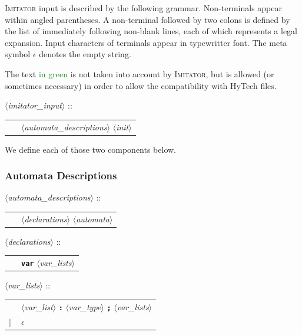 \documentclass[a4paper,10pt]{article}
\newcommand{\emptystring}{$\epsilon$}
\newcommand{\hytech}{{\sc HyTech}}
\newcommand{\imitator}{\textsc{Imitator}}
\newcommand{\nt}[1]{$\langle$\emph{#1}$\rangle$}
\newcommand{\regleGrammaire}[1]{\bigskip \noindent \nt{#1} :: \\}
\newcommand{\npec}[1]{\textcolor{green}{#1}}
\newcommand{\code}[1]{\textbf{\texttt{#1}}}
\begin{document}
\imitator{} input is described by the following grammar.
Non-terminals appear within angled parentheses.
A non-terminal followed by two colons is defined by the list of immediately following non-blank lines, each of which represents a legal expansion.
Input characters of terminals appear in typewritter font.
The meta symbol \emptystring{} denotes the empty string.

The text \npec{in green} is not taken into account by \imitator{}, but is allowed (or sometimes necessary) in order to allow the compatibility with \hytech{} files.


\regleGrammaire{imitator\_input}
\begin{tabular}{l l}
	\  & \nt{automata\_descriptions} \nt{init} \\
\end{tabular}

\medskip


We define each of those two components below.

\subsubsection{Automata Descriptions}

\regleGrammaire{automata\_descriptions}
\begin{tabular}{l l}
	\  & \nt{declarations} \nt{automata} \\
\end{tabular}

\regleGrammaire{declarations}
\begin{tabular}{l l}
	\  & \code{var} \nt{var\_lists} \\
\end{tabular}

\regleGrammaire{var\_lists}
\begin{tabular}{l l}
	\  & \nt{var\_list} \code{:} \nt{var\_type} \code{;} \nt{var\_lists} \\
	$|$ & \emptystring
\end{tabular}
\end{document}

